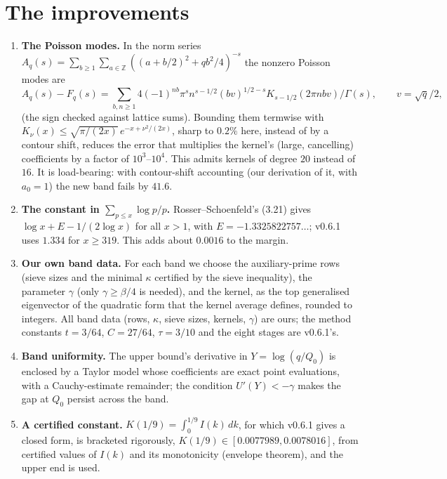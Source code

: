 \documentclass[11pt]{article}
\theoremstyle{definition}
\newcommand{\Z}{\mathbb{Z}}
\begin{document}
\section{The improvements}\label{sec:improvement}
\begin{enumerate}[leftmargin=*]
\item \textbf{The Poisson modes.} In the norm series $A_q(s) = \sum_{b\ge1}\sum_{a\in\Z} ((a+b/2)^2 + qb^2/4)^{-s}$ the nonzero Poisson modes are
\[ A_q(s) - F_q(s) = \sum_{b,n\ge1} 4(-1)^{nb}\pi^s n^{s-1/2}(bv)^{1/2-s}K_{s-1/2}(2\pi n b v)/\Gamma(s),\qquad v = \sqrt q/2,\]
(the sign checked against lattice sums). Bounding them termwise with $K_\nu(x) \le \sqrt{\pi/(2x)}\,e^{-x+\nu^2/(2x)}$, sharp to $0.2\%$ here, instead of by a contour shift, reduces the error that multiplies the kernel's (large, cancelling) coefficients by a factor of $10^3$--$10^4$. This admits kernels of degree $20$ instead of $16$. It is load-bearing: with contour-shift accounting (our derivation of it, with $a_0 = 1$) the new band fails by $41.6$.
\item \textbf{The constant in $\sum_{p\le x}\log p/p$.} Rosser--Schoenfeld's (3.21) gives $\log x + E - 1/(2\log x)$ for all $x > 1$, with $E = -1.3325822757\ldots$; v0.6.1 uses $1.334$ for $x \ge 319$. This adds about $0.0016$ to the margin.
\item \textbf{Our own band data.} For each band we choose the auxiliary-prime rows (sieve sizes and the minimal $\kappa$ certified by the sieve inequality), the parameter $\gamma$ (only $\gamma \ge \beta/4$ is needed), and the kernel, as the top generalised eigenvector of the quadratic form that the kernel average defines, rounded to integers. All band data (rows, $\kappa$, sieve sizes, kernels, $\gamma$) are ours; the method constants $t = 3/64$, $C = 27/64$, $\tau = 3/10$ and the eight stages are v0.6.1's.
\item \textbf{Band uniformity.} The upper bound's derivative in $Y = \log(q/Q_0)$ is enclosed by a Taylor model whose coefficients are exact point evaluations, with a Cauchy-estimate remainder; the condition $U'(Y) < -\gamma$ makes the gap at $Q_0$ persist across the band.
\item \textbf{A certified constant.} $K(1/9) = \int_0^{1/9} I(k)\,dk$, for which v0.6.1 gives a closed form, is bracketed rigorously, $K(1/9) \in [0.0077989, 0.0078016]$, from certified values of $I(k)$ and its monotonicity (envelope theorem), and the upper end is used.
\end{enumerate}
\end{document}
